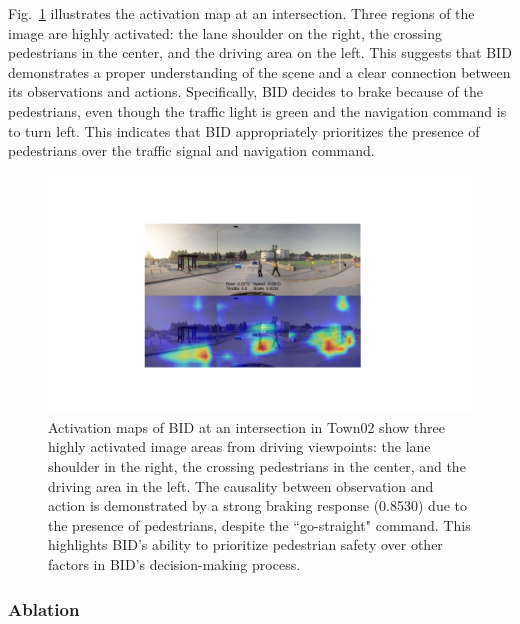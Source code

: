 Fig.~\ref{fig:attention_ped_greed} illustrates the activation map at an intersection. 
Three regions of the image are highly activated: the lane shoulder on the right, the crossing pedestrians in the center, and the driving area on the left. 
This suggests that BID demonstrates a proper understanding of the scene and a clear connection between its observations and actions. 
Specifically, BID decides to brake because of the pedestrians, even though the traffic light is green and the navigation command is to turn left. 
This indicates that BID appropriately prioritizes the presence of pedestrians over the traffic signal and navigation command.


\begin{figure}[ht!]
	\centering
	\includegraphics[width=\linewidth]{fig/attention_ped_greed.pdf}
	\caption{Activation maps of BID at an intersection in Town02 show three highly activated image areas from driving viewpoints: 
		the lane shoulder in the right, the crossing pedestrians in the center, and the driving area in the left. 
		The causality between observation and action is demonstrated by a strong braking response (0.8530) due to the presence of pedestrians, despite the ``go-straight" command. 
		This highlights BID's ability to prioritize pedestrian safety over other factors in BID's decision-making process. }
	\label{fig:attention_ped_greed}
\end{figure}



\subsubsection{Ablation}

